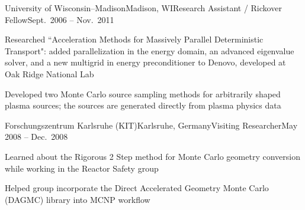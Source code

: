 \clearpage
\begin{rSubsection}{University of Wisconsin--Madison}{Madison, WI}{Research Assistant / Rickover Fellow}{Sept.\ 2006 -- Nov.\ 2011}
\item Researched ``Acceleration Methods for Massively Parallel Deterministic Transport": added parallelization in the energy domain, an advanced eigenvalue solver, and a new multigrid in energy preconditioner to Denovo, developed at Oak Ridge National Lab
\item Developed two Monte Carlo source sampling methods for arbitrarily shaped plasma sources; the sources are generated directly from plasma physics data
\end{rSubsection}




\begin{rSubsection}{Forschungszentrum Karlsruhe (KIT)}{Karlsruhe, Germany}{Visiting Researcher}{May 2008 -- Dec.\ 2008}
\item Learned about the Rigorous 2 Step method for Monte Carlo geometry conversion while working in the Reactor Safety group
\item Helped group incorporate the Direct Accelerated Geometry Monte Carlo (DAGMC) library into MCNP workflow
\end{rSubsection}


